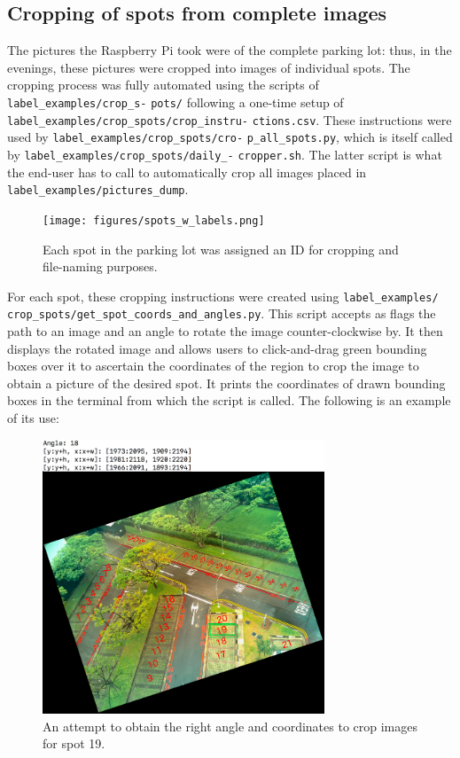 \documentclass[a4paper, 11pt]{article} %
\begin{document}
	\subsection{Cropping of spots from complete images}
		The pictures the Raspberry Pi took were of the complete parking lot: 
		thus, in the evenings, these pictures were cropped into images of 
		individual spots. The cropping process was fully automated using the 
		scripts of \texttt{label\_examples/crop\_s-} \texttt{pots/} following a 
		one-time 
		setup of 
		\texttt{label\_examples/crop\_spots/crop\_instru-} \texttt{ctions.csv}. 
		These instructions were 
		used by
		\texttt{label\_examples/crop\_spots/cro-} \texttt{p\_all\_spots.py}, 
		which is 
		itself called by
		\texttt{label\_examples/crop\_spots/daily\_-} \texttt{cropper.sh}. The 
		latter 
		script is 
		what the end-user has to call to automatically
		crop all images placed in \texttt{label\_examples/pictures\_dump}.
		\begin{figure}[H]
			\centering
			\texttt{[image: figures/spots\_w\_labels.png]}
			\caption{Each spot in the parking lot was assigned an ID for 
			cropping and file-naming purposes.}
		\end{figure}
		\hspace*{-6mm}For each spot, these cropping instructions were created 
		using \texttt{label\_examples/} 
		\texttt{crop\_spots/get\_spot\_coords\_and\_angles.py}.
		This script accepts as flags
		the path to an image and an angle to rotate the image counter-clockwise 
		by. It then displays the
		rotated image and allows users to click-and-drag green bounding boxes 
		over it to ascertain the coordinates
		of the region to crop the image to obtain a picture of the desired spot. It prints the coordinates of drawn
		bounding boxes in the terminal from which the script is called. The following is an example of its use:
		\begin{figure}[H]
			\centering
			\includegraphics[width=0.75\textwidth]{figures/spot_coord_demo}
			\caption{An attempt to obtain the right angle and 
			coordinates to crop images for spot 19.}
		\end{figure}
\end{document}
